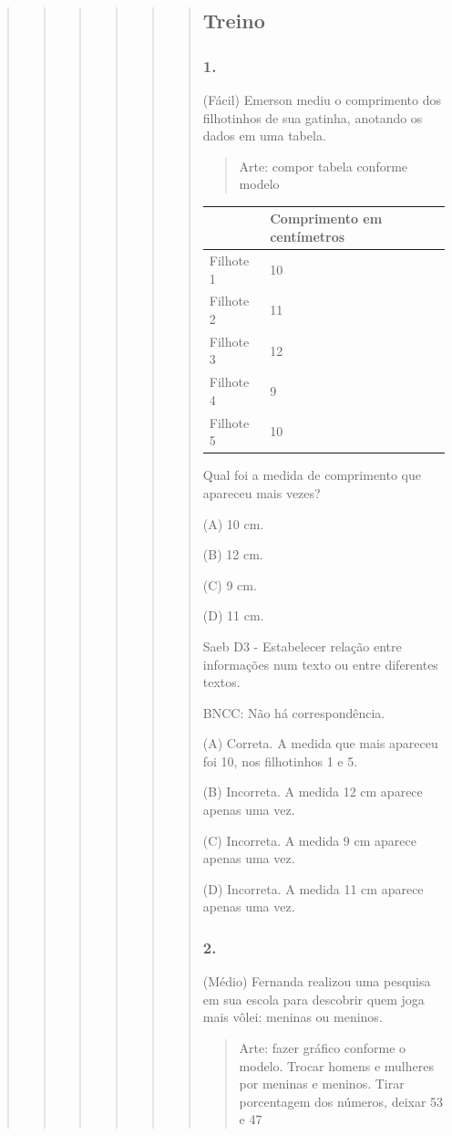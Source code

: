 \begin{quote}
\begin{quote}
\begin{quote}
\begin{quote}
\begin{quote}
\begin{quote}
\subsection{Treino}\label{treino-8}

\subsubsection{1.}\label{section-68}

(Fácil) Emerson mediu o comprimento dos filhotinhos de sua gatinha,
anotando os dados em uma tabela.

\begin{quote}
Arte: compor tabela conforme modelo
\end{quote}

\begin{longtable}[]{@{}ll@{}}
\toprule
& \textbf{Comprimento em centímetros}\tabularnewline
\midrule
\endhead
Filhote 1 & 10\tabularnewline
Filhote 2 & 11\tabularnewline
Filhote 3 & 12\tabularnewline
Filhote 4 & 9\tabularnewline
Filhote 5 & 10\tabularnewline
\bottomrule
\end{longtable}

Qual foi a medida de comprimento que apareceu mais vezes?

(A) 10 cm.

(B) 12 cm.

(C) 9 cm.

(D) 11 cm.

Saeb D3 - Estabelecer relação entre informações num texto ou entre
diferentes textos.

BNCC: Não há correspondência.

(A) Correta. A medida que mais apareceu foi 10, nos filhotinhos 1 e 5.

(B) Incorreta. A medida 12 cm aparece apenas uma vez.

(C) Incorreta. A medida 9 cm aparece apenas uma vez.

(D) Incorreta. A medida 11 cm aparece apenas uma vez.

\subsubsection{2. }\label{section-69}

(Médio) Fernanda realizou uma pesquisa em sua escola para descobrir quem
joga mais vôlei: meninas ou meninos.

\begin{quote}
Arte: fazer gráfico conforme o modelo. Trocar homens e mulheres por
meninas e meninos. Tirar porcentagem dos números, deixar 53 e 47
\end{quote}


\end{quote}
\end{quote}
\end{quote}
\end{quote}
\end{quote}
\end{quote}
